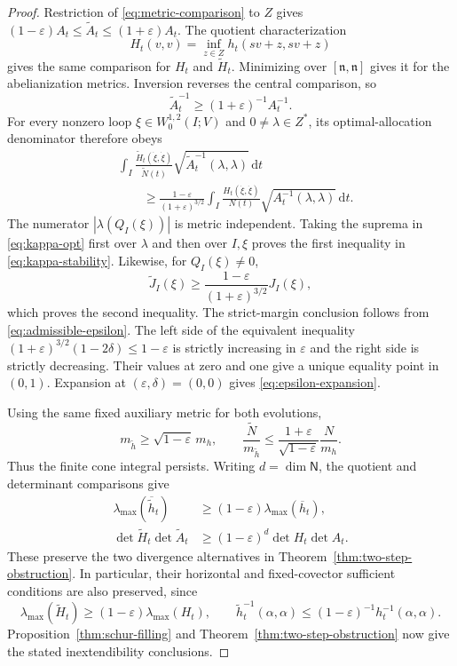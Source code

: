 \documentclass[10pt,a4paper]{article}
\numberwithin{equation}{section}
\theoremstyle{definition}
\theoremstyle{remark}
\newcommand{\dd}{\mathrm d}
\newcommand{\eps}{\varepsilon}
\begin{document}
\begin{proof}
Restriction of \eqref{eq:metric-comparison} to $Z$ gives
$(1-\eps)A_t\le\widetilde A_t\le(1+\eps)A_t$.  The quotient
characterization
\begin{equation}
 H_t(v,v)=\inf_{z\in Z}h_t(sv+z,sv+z)
 \label{eq:quotient-characterization}
\end{equation}
gives the same comparison for $H_t$ and $\widetilde H_t$.
Minimizing over $[\mathfrak n,\mathfrak n]$ gives it for the
abelianization metrics.  Inversion reverses the central comparison, so
\[
 \widetilde A_t^{-1}\ge(1+\eps)^{-1}A_t^{-1}.
\]
For every nonzero loop $\xi\in W^{1,2}_0(I;V)$ and
$0\ne\lambda\in Z^*$, its optimal-allocation denominator therefore obeys
\begin{align*}
 &\int_I\frac{\widetilde H_t(\dot\xi,\dot\xi)}{\widetilde N(t)}
        \sqrt{\widetilde A_t^{-1}(\lambda,\lambda)}\,\dd t\\
 &\qquad\ge
 \frac{1-\eps}{(1+\eps)^{3/2}}
 \int_I\frac{H_t(\dot\xi,\dot\xi)}{N(t)}
        \sqrt{A_t^{-1}(\lambda,\lambda)}\,\dd t.
\end{align*}
The numerator $|\lambda(Q_I(\xi))|$ is metric independent.
Taking the suprema in \eqref{eq:kappa-opt} first over $\lambda$ and
then over $I,\xi$ proves the first inequality in
\eqref{eq:kappa-stability}.
Likewise, for $Q_I(\xi)\ne0$,
\[
 \widetilde J_I(\xi)
 \ge\frac{1-\eps}{(1+\eps)^{3/2}}J_I(\xi),
\]
which proves the second inequality.
The strict-margin conclusion follows from
\eqref{eq:admissible-epsilon}.
The left side of the equivalent inequality
$(1+\eps)^{3/2}(1-2\delta)\le1-\eps$ is strictly increasing in $\eps$
and the right side is strictly decreasing.
Their values at zero and one give a unique equality point in $(0,1)$.
Expansion at $(\eps,\delta)=(0,0)$ gives
\eqref{eq:epsilon-expansion}.

Using the same fixed auxiliary metric for both evolutions,
\[
 m_{\widetilde h}\ge\sqrt{1-\eps}\,m_h,\qquad
 \frac{\widetilde N}{m_{\widetilde h}}
 \le\frac{1+\eps}{\sqrt{1-\eps}}\frac N{m_h}.
\]
Thus the finite cone integral persists.  Writing $d=\dim\mathsf N$,
the quotient and determinant comparisons give
\begin{align*}
 \lambda_{\max}(\overline{\widetilde h}_t)
    &\ge(1-\eps)\lambda_{\max}(\overline h_t),\\
 \det\widetilde H_t\det\widetilde A_t
    &\ge(1-\eps)^d\det H_t\det A_t.
\end{align*}
These preserve the two divergence alternatives in
Theorem~\ref{thm:two-step-obstruction}.
In particular, their horizontal and fixed-covector sufficient
conditions are also preserved, since
\[
 \lambda_{\max}(\widetilde H_t)
    \ge(1-\eps)\lambda_{\max}(H_t),\qquad
 \widetilde h_t^{-1}(\alpha,\alpha)
    \le(1-\eps)^{-1}h_t^{-1}(\alpha,\alpha).
\]
Proposition~\ref{thm:schur-filling} and
Theorem~\ref{thm:two-step-obstruction} now give the stated
inextendibility conclusions.
\end{proof}
\end{document}
